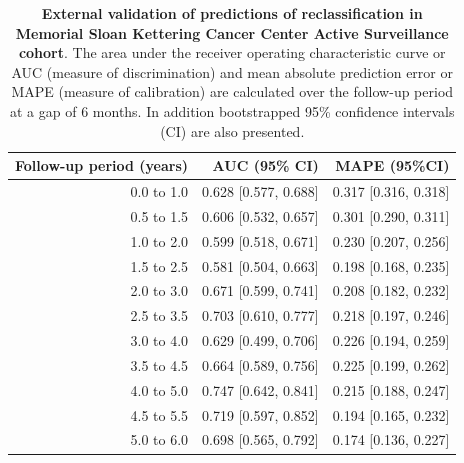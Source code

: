\begin{table}[!htb]
\small\sf\centering
\caption{\textbf{External validation of predictions of reclassification in Memorial Sloan Kettering Cancer Center Active Surveillance cohort}. The area under the receiver operating characteristic curve or AUC (measure of discrimination) and mean absolute prediction error or MAPE (measure of calibration) are calculated over the follow-up period at a gap of 6 months. In addition bootstrapped 95\% confidence intervals (CI) are also presented.}
\label{tab:AUC_PE_MSKCC}
\begin{tabular}{r|r|r}
\hline
\hline
Follow-up period (years) & AUC (95\% CI) & MAPE (95\%CI)\\ 
\hline
0.0 to 1.0 & 0.628 [0.577, 0.688]  & 0.317 [0.316, 0.318]\\
0.5 to 1.5 & 0.606 [0.532, 0.657]  & 0.301 [0.290, 0.311]\\
1.0 to 2.0 & 0.599 [0.518, 0.671]  & 0.230 [0.207, 0.256]\\
1.5 to 2.5 & 0.581 [0.504, 0.663]  & 0.198 [0.168, 0.235]\\
2.0 to 3.0 & 0.671 [0.599, 0.741]  & 0.208 [0.182, 0.232]\\
2.5 to 3.5 & 0.703 [0.610, 0.777]  & 0.218 [0.197, 0.246]\\
3.0 to 4.0 & 0.629 [0.499, 0.706]  & 0.226 [0.194, 0.259]\\
3.5 to 4.5 & 0.664 [0.589, 0.756]  & 0.225 [0.199, 0.262]\\
4.0 to 5.0 & 0.747 [0.642, 0.841]  & 0.215 [0.188, 0.247]\\
4.5 to 5.5 & 0.719 [0.597, 0.852]  & 0.194 [0.165, 0.232]\\
5.0 to 6.0 & 0.698 [0.565, 0.792]  & 0.174 [0.136, 0.227]\\
\hline
\end{tabular}	
\end{table}

